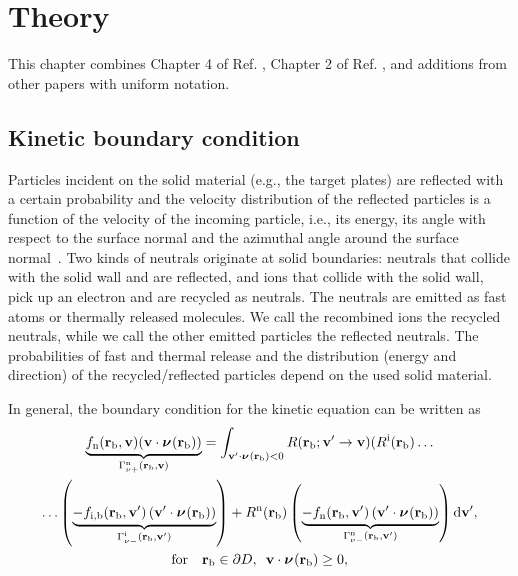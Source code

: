 \chapter{Theory}

This chapter combines Chapter 4 of Ref. \cite{phd_niels}, Chapter 2 of Ref. \cite{phd_wim}, and additions from other papers \cite{nf_niels,nf_wim,pet_maarten,psi_niels,psi_maarten} with uniform notation.


\section{Kinetic boundary condition} \label{sec:kineticbc}

Particles incident on the solid material (e.g., the target plates) are reflected with a certain probability and the velocity distribution of the reflected particles is a function of the velocity of the incoming particle, i.e., its energy, its angle with respect to the surface normal and the azimuthal angle around the surface normal~\cite{heifetz1982monte}.  Two kinds of neutrals originate at solid boundaries: neutrals that collide with the solid wall and are reflected, and ions that collide with the solid wall, pick up an electron and are recycled as neutrals. The neutrals are emitted as fast atoms or thermally released molecules. We call the recombined ions the recycled neutrals, while we call the other emitted particles the reflected neutrals. The probabilities of fast and thermal release and the distribution (energy and direction) of the recycled/reflected particles depend on the used solid material.

In general, the boundary condition for the kinetic equation can be written as
\begin{multline}
\underbrace{f_{\mathrm{n}}({\bf r}_{\mathrm{b}},{\bf v}) ({\bf v} \cdot {\boldsymbol \nu}_{}({\bf r}_{\mathrm{b}}))}_{\Gamma_{\nu +}^{\mathrm{n}}({\bf r}_{\mathrm{b}},{\bf v})} = \int_{{\bf v}'\cdot{\boldsymbol \nu}_{}({\bf r}_{\mathrm{b}}) < 0} R({\bf r}_{\mathrm{b}};{\bf v}' \rightarrow {\bf v})(R^{\mathrm{i}}({\bf r}_{\mathrm{b}}) \ldots \\
 \ldots \left( \underbrace{- f_{\mathrm{i},\mathrm{b}}({\bf r}_{\mathrm{b}},{\bf v}') \left( {\bf v}' \cdot {\boldsymbol \nu}_{}({\bf r}_{\mathrm{b}}) \right)}_{\Gamma_{\nu -}^{\mathrm{i}}({\bf r}_{\mathrm{b}},{\bf v}')} \right) + R^{\mathrm{n}}({\bf r}_{\mathrm{b}}) \left( \underbrace{-f_{\mathrm{n}}({\bf r}_{\mathrm{b}},{\bf v}') \left( {\bf v}' \cdot {\boldsymbol \nu}_{}({\bf r}_{\mathrm{b}}) \right)}_{\Gamma_{\nu -}^{\mathrm{n}}({\bf r}_{\mathrm{b}},{\bf v}')} \right) \mathrm{d} {\bf v}', \\
 \text{for} \quad {\bf r}_{\mathrm{b}} \in \partial D, \enskip {\bf v} \cdot {\boldsymbol \nu}_{}({\bf r}_{\mathrm{b}}) \geq 0, \label{eq:kineticbc}
\end{multline}

